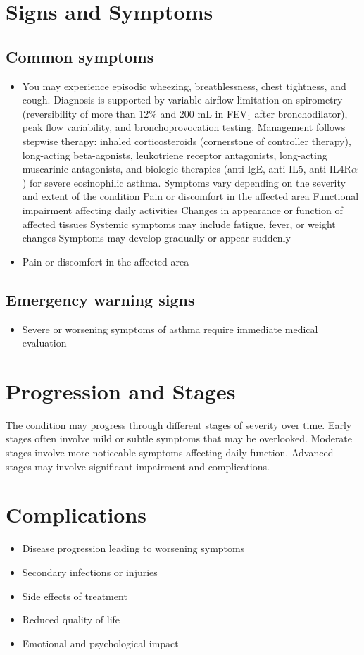 \section{Signs and Symptoms}

\subsection{Common symptoms}
\begin{itemize}[noitemsep]
  \item You may experience episodic wheezing, breathlessness, chest tightness, and cough. Diagnosis is supported by variable airflow limitation on spirometry (reversibility of more than 12\% and 200 mL in FEV$_1$ after bronchodilator), peak flow variability, and bronchoprovocation testing. Management follows stepwise therapy: inhaled corticosteroids (cornerstone of controller therapy), long-acting beta-agonists, leukotriene receptor antagonists, long-acting muscarinic antagonists, and biologic therapies (anti-IgE, anti-IL5, anti-IL4R$\alpha$) for severe eosinophilic asthma. Symptoms vary depending on the severity and extent of the condition Pain or discomfort in the affected area Functional impairment affecting daily activities Changes in appearance or function of affected tissues Systemic symptoms may include fatigue, fever, or weight changes Symptoms may develop gradually or appear suddenly
  \item Pain or discomfort in the affected area
  \end{itemize}

\subsection{Emergency warning signs}
\begin{itemize}[noitemsep]
  \item Severe or worsening symptoms of asthma require immediate medical evaluation
\end{itemize}
\section{Progression and Stages}
The condition may progress through different stages of severity over time. Early stages often involve mild or subtle symptoms that may be overlooked. Moderate stages involve more noticeable symptoms affecting daily function. Advanced stages may involve significant impairment and complications.
\section{Complications}
\begin{itemize}[noitemsep]
  \item Disease progression leading to worsening symptoms
  \item Secondary infections or injuries
  \item Side effects of treatment
  \item Reduced quality of life
  \item Emotional and psychological impact
\end{itemize}
